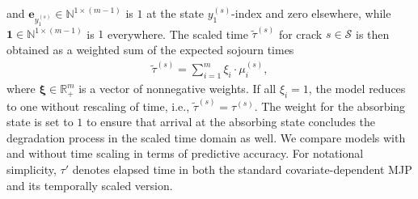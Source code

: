 and $\bm{e}_{y_{1}^{(s)}} \in \mathbb{N}^{1 \times (m-1)}$ is $1$ at the state $y_{1}^{(s)}$-index and zero elsewhere, while $\bm{1} \in \mathbb{N}^{1 \times (m-1)}$ is $1$ everywhere. 
The scaled time $\widetilde{\tau}^{(s)}$ for crack $s \in \mathcal S$ is then obtained as a weighted sum of the expected sojourn times
\begin{align}
\widetilde\tau^{(s)}= \sum_{i = 1}^m \xi_i  \cdot \mu_i^{(s)}, \label{eq:warped_time}
\end{align}
where $\bm{\xi} \in \mathbb{R}_+^m$ is a vector of nonnegative weights. 
If all $\xi_i = 1$, the model reduces to one without rescaling of time, i.e., $\widetilde\tau^{(s)} = \tau^{(s)}$. The weight for the absorbing state is set to $1$ to ensure that arrival at the absorbing state concludes the degradation process in the scaled time domain as well.
We compare models with and without time scaling in terms of predictive accuracy. For notational simplicity, $\tau'$ denotes elapsed time in both the standard covariate-dependent MJP and its temporally scaled version.


%



